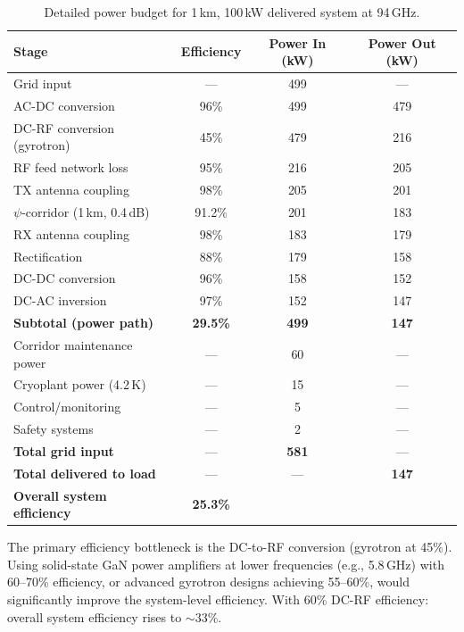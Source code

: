 \documentclass[11pt,a4paper]{article}
\begin{document}
\begin{table}[h]
\centering
\caption{Detailed power budget for 1\,km, 100\,kW delivered system at 94\,GHz.}
\begin{tabular}{lccc}
\toprule
Stage & Efficiency & Power In (kW) & Power Out (kW) \\
\midrule
Grid input & --- & 499 & --- \\
AC-DC conversion & 96\% & 499 & 479 \\
DC-RF conversion (gyrotron) & 45\% & 479 & 216 \\
RF feed network loss & 95\% & 216 & 205 \\
TX antenna coupling & 98\% & 205 & 201 \\
$\psi$-corridor (1\,km, 0.4\,dB) & 91.2\% & 201 & 183 \\
RX antenna coupling & 98\% & 183 & 179 \\
Rectification & 88\% & 179 & 158 \\
DC-DC conversion & 96\% & 158 & 152 \\
DC-AC inversion & 97\% & 152 & 147 \\
\midrule
\textbf{Subtotal (power path)} & \textbf{29.5\%} & \textbf{499} & \textbf{147} \\
\midrule
Corridor maintenance power & --- & 60 & --- \\
Cryoplant power (4.2\,K) & --- & 15 & --- \\
Control/monitoring & --- & 5 & --- \\
Safety systems & --- & 2 & --- \\
\midrule
\textbf{Total grid input} & --- & \textbf{581} & --- \\
\textbf{Total delivered to load} & --- & --- & \textbf{147} \\
\textbf{Overall system efficiency} & \textbf{25.3\%} & & \\
\bottomrule
\end{tabular}
\end{table}

\begin{tcolorbox}[colback=yellow!10!white, colframe=orange!70!black, title=Design Note]
The primary efficiency bottleneck is the DC-to-RF conversion (gyrotron at 45\%).
Using solid-state GaN power amplifiers at lower frequencies (e.g., 5.8\,GHz) with
60--70\% efficiency, or advanced gyrotron designs achieving 55--60\%, would
significantly improve the system-level efficiency. With 60\% DC-RF efficiency:
overall system efficiency rises to $\sim$33\%.
\end{tcolorbox}
\end{document}
